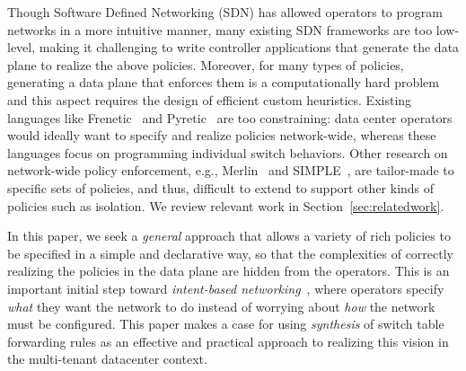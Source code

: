Though Software Defined Networking (SDN) has allowed operators
to program networks in a more intuitive manner, many existing SDN
frameworks are too low-level, making it challenging
to write controller applications that generate the
data plane to realize the above policies. %
Moreover, for many types of
  policies, generating a data plane 
  that enforces them is a
computationally hard problem and
this aspect requires the design of efficient custom heuristics.
Existing
languages like Frenetic~\cite{frenetic} and Pyretic~\cite{pyretic} are
too constraining: data center operators would ideally want to specify
and realize policies network-wide, whereas these languages focus on
programming individual switch behaviors. %
Other research on network-wide policy enforcement, e.g.,
Merlin~\cite{merlin} and SIMPLE~\cite{simple}, are tailor-made to
specific sets of policies, and thus, difficult to extend to support
other kinds of policies such as isolation. We review relevant work in
Section~\ref{sec:relatedwork}.


In this paper, we seek a {\em general} approach that allows a variety
of rich policies to be specified in a simple and declarative way, so
that the complexities of correctly realizing the policies in the data
plane are hidden from the operators. This is an important
initial step toward {\em intent-based networking}~\cite{intent}, where
operators specify {\em what} they want the network to do instead of
worrying about {\em how} the network must be configured.
This paper makes a case for using \emph{synthesis} of switch table
forwarding rules as an effective and practical approach to realizing
this vision in the multi-tenant datacenter context.

